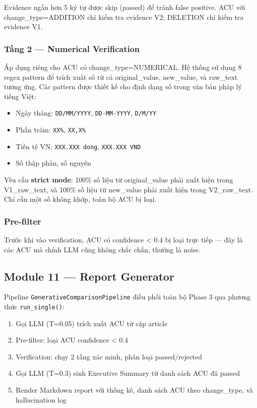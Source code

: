 Evidence ngắn hơn 5 ký tự được skip (passed) để tránh false positive. ACU với change\_type=ADDITION chỉ kiểm tra evidence V2; DELETION chỉ kiểm tra evidence V1.

\subsubsection{Tầng 2 — Numerical Verification}

Áp dụng riêng cho ACU có change\_type=NUMERICAL. Hệ thống sử dụng 8 regex pattern để trích xuất số từ cả original\_value, new\_value, và raw\_text tương ứng. Các pattern được thiết kế cho định dạng số trong văn bản pháp lý tiếng Việt:

\begin{itemize}
    \item Ngày tháng: \texttt{DD/MM/YYYY}, \texttt{DD-MM-YYYY}, \texttt{D/M/YY}
    \item Phần trăm: \texttt{XX\%}, \texttt{XX,X\%}
    \item Tiền tệ VN: \texttt{XXX.XXX dong}, \texttt{XXX.XXX VND}
    \item Số thập phân, số nguyên
\end{itemize}

Yêu cầu \textbf{strict mode}: 100\% số liệu từ original\_value phải xuất hiện trong V1\_raw\_text, và 100\% số liệu từ new\_value phải xuất hiện trong V2\_raw\_text. Chỉ cần một số không khớp, toàn bộ ACU bị loại.

\subsubsection{Pre-filter}

Trước khi vào verification, ACU có confidence < 0.4 bị loại trực tiếp — đây là các ACU mà chính LLM cũng không chắc chắn, thường là noise.

\subsection{Module 11 — Report Generator}

Pipeline \texttt{GenerativeComparisonPipeline} điều phối toàn bộ Phase 3 qua phương thức \texttt{run\_single()}:

\begin{enumerate}[label=(\arabic*)]
    \item Gọi LLM (T=0.05) trích xuất ACU từ cặp article
    \item Pre-filter: loại ACU confidence < 0.4
    \item Verification: chạy 2 tầng xác minh, phân loại passed/rejected
    \item Gọi LLM (T=0.3) sinh Executive Summary từ danh sách ACU đã passed
    \item Render Markdown report với thống kê, danh sách ACU theo change\_type, và hallucination log
\end{enumerate}

